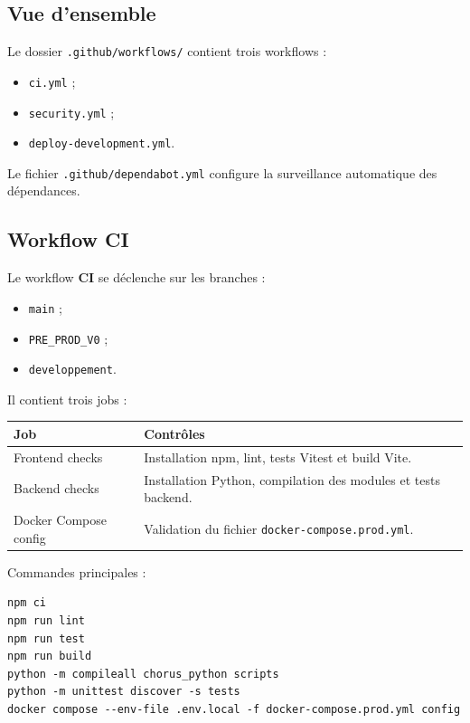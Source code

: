 \documentclass[11pt,a4paper]{article}
\begin{document}
\subsection{Vue d'ensemble}

Le dossier \texttt{.github/workflows/} contient trois workflows :

\begin{itemize}
  \item \texttt{ci.yml} ;
  \item \texttt{security.yml} ;
  \item \texttt{deploy-development.yml}.
\end{itemize}

Le fichier \texttt{.github/dependabot.yml} configure la surveillance automatique
des dépendances.

\subsection{Workflow CI}

Le workflow \textbf{CI} se déclenche sur les branches :

\begin{itemize}
  \item \texttt{main} ;
  \item \texttt{PRE\_PROD\_V0} ;
  \item \texttt{developpement}.
\end{itemize}

Il contient trois jobs :

\begin{longtable}{|p{}|p{}|}
  \hline
  \textbf{Job} & \textbf{Contrôles} \\
  \hline
  Frontend checks &
  Installation npm, lint, tests Vitest et build Vite. \\
  \hline
  Backend checks &
  Installation Python, compilation des modules et tests backend. \\
  \hline
  Docker Compose config &
  Validation du fichier \texttt{docker-compose.prod.yml}. \\
  \hline
\end{longtable}

Commandes principales :

\begin{lstlisting}
npm ci
npm run lint
npm run test
npm run build
python -m compileall chorus_python scripts
python -m unittest discover -s tests
docker compose --env-file .env.local -f docker-compose.prod.yml config
\end{lstlisting}
\end{document}
